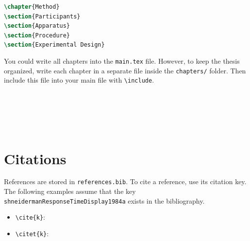 \begin{lstlisting}[language=TeX,caption={Chapters, sections, and subsections},title={Creating Chapters}]
\chapter{Method}
\section{Participants}
\section{Apparatus}
\section{Procedure}
\section{Experimental Design}
\end{lstlisting}

You could write all chapters into the \texttt{main.tex} file. However, to keep the thesis organized, write each chapter in a separate file inside the \texttt{chapters/} folder. Then include this file into your main file with \texttt{\textbackslash include}.

\begin{lstlisting}[language=TeX,caption={Including chapter files in main.tex}]






\end{lstlisting}


\section{Citations}

References are stored in \texttt{references.bib}. To cite a reference, use its citation key. The following examples assume that the key \texttt{shneidermanResponseTimeDisplay1984a} exists in the bibliography.

\begin{itemize}
    \item \texttt{\textbackslash cite\{k\}}: \cite{shneidermanResponseTimeDisplay1984a}
    \item \texttt{\textbackslash citet\{k\}}: \citet{shneidermanResponseTimeDisplay1984a}
\end{itemize}

